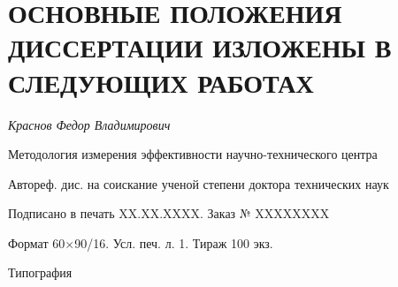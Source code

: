 \section*{ОСНОВНЫЕ ПОЛОЖЕНИЯ ДИССЕРТАЦИИ ИЗЛОЖЕНЫ В СЛЕДУЮЩИХ РАБОТАХ}

\begin{refsection}[vak]
    \nocite{*}
	\printbibliography[title={Публикации в изданиях, рекомендованных ВАК}]
\end{refsection}

\begin{refsection}[svid]
    \nocite{*}
	\printbibliography[title={Патенты и регистрации программных продуктов}]
\end{refsection}

\begin{refsection}[conf]
    \nocite{*}
	\printbibliography[title={Материалы докладов конференций}]
\end{refsection}

\begin{refsection}[papers]
    \nocite{*}
	\printbibliography[title={Статьи в журналах}]
\end{refsection}



\newpage\thispagestyle{empty}

\vspace*{0pt plus1fill}

\small
\begin{center}
    \textit{Краснов Федор Владимирович}
    \par\medskip
    
    Методология измерения эффективности научно-технического центра
    
    \par\medskip
    
    Автореф. дис. на соискание ученой степени доктора технических наук
    \par\bigskip
    
    Подписано в печать XX.XX.XXXX.
    Заказ № XXXXXXXX
    
    Формат 60\(\times\)90/16. Усл. печ. л. 1. Тираж 100 экз.
    
    Типография \blank[0.5\linewidth]
\end{center}
\cleardoublepage
